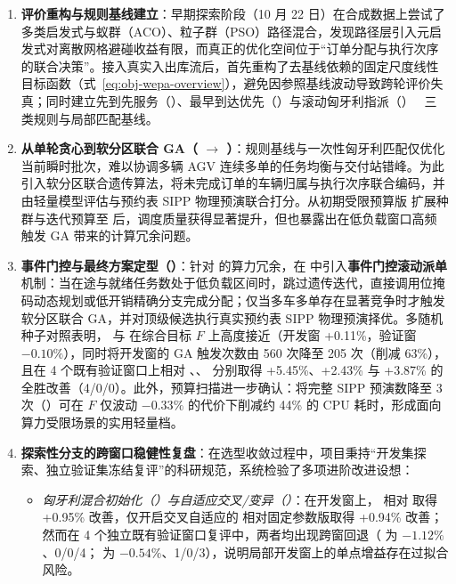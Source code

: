 \begin{enumerate}
  \item \textbf{评价重构与规则基线建立}：早期探索阶段（10 月 22 日）在合成数据上尝试了多类启发式与蚁群（ACO）、粒子群（PSO）路径混合，发现路径层引入元启发式对离散网格避碰收益有限，而真正的优化空间位于“订单分配与执行次序的联合决策”。接入真实入出库流后，首先重构了去基线依赖的固定尺度线性目标函数（式~\eqref{eq:obj-wepa-overview}），避免因参照基线波动导致跨轮评价失真；同时建立先到先服务（）、最早到达优先（）与滚动匈牙利指派（）~\cite{kuhn1955hungarian} 三类规则与局部匹配基线。
  \item \textbf{从单轮贪心到软分区联合 GA（ $\rightarrow$ ）}：规则基线与一次性匈牙利匹配仅优化当前瞬时批次，难以协调多辆 AGV 连续多单的任务均衡与交付站错峰。为此引入软分区联合遗传算法，将未完成订单的车辆归属与执行次序联合编码，并由轻量模型评估与预约表 SIPP 物理预演联合打分。从初期受限预算版  扩展种群与迭代预算至  后，调度质量获得显著提升，但也暴露出在低负载窗口高频触发 GA 带来的计算冗余问题。
  \item \textbf{事件门控与最终方案定型（）}：针对  的算力冗余，在  中引入\textbf{事件门控滚动派单}机制：当在途与就绪任务数处于低负载区间时，跳过遗传迭代，直接调用位掩码动态规划或低开销精确分支完成分配；仅当多车多单存在显著竞争时才触发软分区联合 GA，并对顶级候选执行真实预约表 SIPP 物理预演择优。多随机种子对照表明， 与  在综合目标 $F$ 上高度接近（开发窗 +0.11\%，验证窗 $-0.10\%$），同时将开发窗的 GA 触发次数由 560 次降至 205 次（削减 63\%），且在 4 个既有验证窗口上相对 、、 分别取得 +5.45\%、+2.43\% 与 +3.87\% 的全胜改善（4/0/0）。此外，预算扫描进一步确认：将完整 SIPP 预演数降至 3 次（）可在 $F$ 仅波动 $-0.33\%$ 的代价下削减约 44\% 的 CPU 耗时，形成面向算力受限场景的实用轻量档。
  \item \textbf{探索性分支的跨窗口稳健性复盘}：在选型收敛过程中，项目秉持“开发集探索、独立验证集冻结复评”的科研规范，系统检验了多项进阶改进设想：
  \begin{itemize}
    \item \emph{匈牙利混合初始化（）与自适应交叉/变异（）}：在开发窗上， 相对  取得 +0.95\% 改善，仅开启交叉自适应的  相对固定参数版取得 +0.94\% 改善；然而在 4 个独立既有验证窗口复评中，两者均出现跨窗回退（ 为 $-1.12\%$、0/0/4； 为 $-0.54\%$、1/0/3），说明局部开发窗上的单点增益存在过拟合风险。

\end{itemize}
\end{enumerate}
